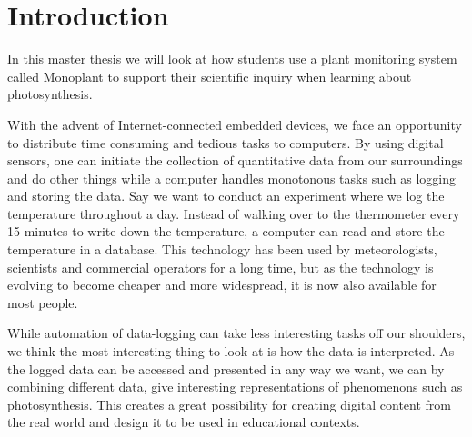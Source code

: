 \setcounter{page}{1}
\chapter{Introduction}
In this master thesis we will look at how students use a plant monitoring system called Monoplant to support their scientific inquiry when learning about photosynthesis. 


With the advent of Internet-connected embedded devices, we face an opportunity to distribute time consuming and tedious tasks to computers. By using digital sensors, one can initiate the collection of quantitative data from our surroundings and do other things while a computer handles monotonous tasks such as logging and storing the data. Say we want to conduct an experiment where we log the temperature throughout a day. Instead of walking over to the thermometer every 15 minutes to write down the temperature, a computer can read and store the temperature in a database. This technology has been used by meteorologists, scientists and commercial operators for a long time, but as the technology is evolving to become cheaper and more widespread, it is now also available for most people. %

While automation of data-logging can take less interesting tasks off our shoulders, we think the most interesting thing to look at is how the data is interpreted. As the logged data can be accessed and presented in any way we want, we can by combining different data, give interesting representations of phenomenons such as photosynthesis. This creates a great possibility for creating digital content from the real world and design it to be used in educational contexts. 

